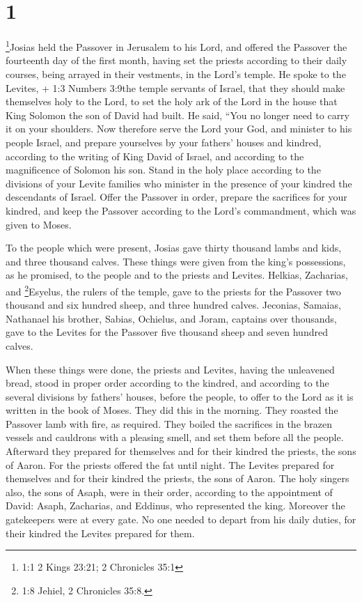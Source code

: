 \hypertarget{section}{%
\section{1}\label{section}}

 \footnote{1:1 2 Kings 23:21; 2 Chronicles 35:1}Josias held
the Passover in Jerusalem to his Lord, and offered the Passover the
fourteenth day of the first month,  having set the priests
according to their daily courses, being arrayed in their vestments, in
the Lord's temple.  He spoke to the Levites, + 1:3 Numbers
3:9the temple servants of Israel, that they should make themselves holy
to the Lord, to set the holy ark of the Lord in the house that King
Solomon the son of David had built.  He said, ``You no
longer need to carry it on your shoulders. Now therefore serve the Lord
your God, and minister to his people Israel, and prepare yourselves by
your fathers' houses and kindred,  according to the writing
of King David of Israel, and according to the magnificence of Solomon
his son. Stand in the holy place according to the divisions of your
Levite families who minister in the presence of your kindred the
descendants of Israel.  Offer the Passover in order, prepare
the sacrifices for your kindred, and keep the Passover according to the
Lord's commandment, which was given to Moses.

 To the people which were present, Josias gave thirty
thousand lambs and kids, and three thousand calves. These things were
given from the king's possessions, as he promised, to the people and to
the priests and Levites.  Helkias, Zacharias, and
\footnote{1:8 Jehiel, 2 Chronicles 35:8.}Esyelus, the rulers of the
temple, gave to the priests for the Passover two thousand and six
hundred sheep, and three hundred calves.  Jeconias, Samaias,
Nathanael his brother, Sabias, Ochielus, and Joram, captains over
thousands, gave to the Levites for the Passover five thousand sheep and
seven hundred calves.

 When these things were done, the priests and Levites,
having the unleavened bread, stood in proper order according to the
kindred,  and according to the several divisions by
fathers' houses, before the people, to offer to the Lord as it is
written in the book of Moses. They did this in the morning.
 They roasted the Passover lamb with fire, as required.
They boiled the sacrifices in the brazen vessels and cauldrons with a
pleasing smell,  and set them before all the people.
Afterward they prepared for themselves and for their kindred the
priests, the sons of Aaron.  For the priests offered the
fat until night. The Levites prepared for themselves and for their
kindred the priests, the sons of Aaron.  The holy singers
also, the sons of Asaph, were in their order, according to the
appointment of David: Asaph, Zacharias, and Eddinus, who represented the
king.  Moreover the gatekeepers were at every gate. No one
needed to depart from his daily duties, for their kindred the Levites
prepared for them.


